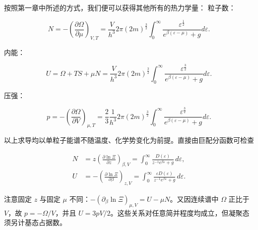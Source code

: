 按照第一章中所述的方式，我们便可以获得其他所有的热力学量：
粒子数：
\begin{linenomath}\begin{equation}
    N = -\left( \frac{\partial \Omega}{\partial \mu} \right)_{V,T} = \frac{V}{h^3} 2\pi (2m)^{\frac32} \int_{0}^{\infty} \frac{\varepsilon^{\frac{1}{2}}}{e^{\beta(\varepsilon - \mu)} + g} d\varepsilon.
\end{equation}\end{linenomath}
内能：
\begin{linenomath}\begin{equation}
    U = \Omega + TS + \mu N = \frac{V}{h^3} 2\pi (2m)^{\frac32} \int_{0}^{\infty} \frac{\varepsilon^{\frac{3}{2}}}{e^{\beta(\varepsilon - \mu)} + g} d\varepsilon.
\end{equation}\end{linenomath}
压强：
\begin{linenomath}\begin{equation}
    p = -\left( \frac{\partial \Omega}{\partial V} \right)_{\mu,T} = \frac{2}{3}\frac{1}{h^3} 2\pi (2m)^{\frac32} \int_{0}^{\infty} \frac{\varepsilon^{\frac{3}{2}}}{e^{\beta(\varepsilon - \mu)} + g} d\varepsilon.
\end{equation}\end{linenomath}
以上求导均以单粒子能谱不随温度、化学势变化为前提。直接由巨配分函数可检查
\begin{linenomath}\begin{align}
    N &= z\left(\frac{\partial\ln\varXi}{\partial z}\right)_{\beta,V}
      =\int_0^\infty\frac{D(\varepsilon)}{z^{-1}e^{\beta\varepsilon}+g}\,d\varepsilon,\\
    U &= -\left(\frac{\partial\ln\varXi}{\partial\beta}\right)_{z,V}
      =\int_0^\infty\frac{\varepsilon D(\varepsilon)}{z^{-1}e^{\beta\varepsilon}+g}\,d\varepsilon.
\end{align}\end{linenomath}
注意固定 $z$ 与固定 $\mu$ 不同：$-(\partial_\beta\ln\varXi)_{\mu,V}=U-\mu N$。又因连续谱中 $\Omega$ 正比于 $V$，故 $p=-\Omega/V$，并且 $U=3pV/2$。这些关系对任意简并程度均成立，但凝聚态须另计基态占据数。

